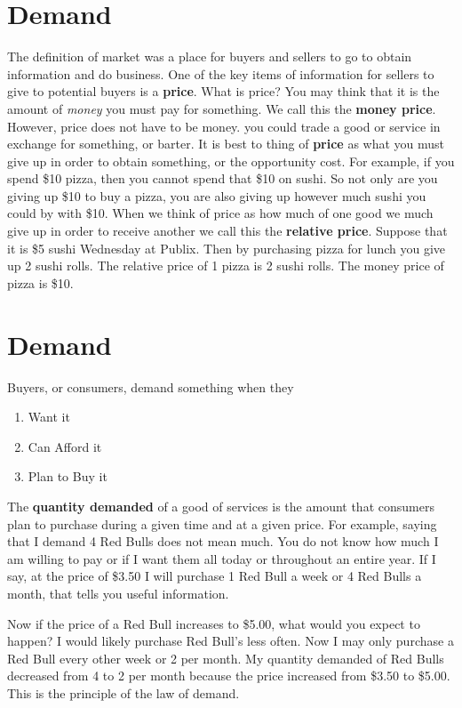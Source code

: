 \documentclass[
]{book}
\providecommand{\tightlist}{%
  \setlength{\itemsep}{0pt}\setlength{\parskip}{0pt}}
\begin{document}
\section{Demand}\label{demand}

The definition of market was a place for buyers and sellers to go to obtain information and do business. One of the key items of information for sellers to give to potential buyers is a \textbf{price}. What is price? You may think that it is the amount of \emph{money} you must pay for something. We call this the \textbf{money price}. However, price does not have to be money. you could trade a good or service in exchange for something, or barter. It is best to thing of \textbf{price }as what you must give up in order to obtain something, or the opportunity cost. For example, if you spend \$10 pizza, then you cannot spend that \$10 on sushi. So not only are you giving up \$10 to buy a pizza, you are also giving up however much sushi you could by with \$10. When we think of price as how much of one good we much give up in order to receive another we call this the \textbf{relative price}. Suppose that it is \$5 sushi Wednesday at Publix. Then by purchasing pizza for lunch you give up 2 sushi rolls. The relative price of 1 pizza is 2 sushi rolls. The money price of pizza is \$10.

\section{Demand}\label{demand-1}

Buyers, or consumers, demand something when they

\begin{enumerate}
\def\labelenumi{\arabic{enumi}.}
\tightlist
\item
  Want it
\item
  Can Afford it
\item
  Plan to Buy it
\end{enumerate}

The \textbf{quantity demanded} of a good of services is the amount that consumers plan to purchase during a given time and at a given price. For example, saying that I demand 4 Red Bulls does not mean much. You do not know how much I am willing to pay or if I want them all today or throughout an entire year. If I say, at the price of \$3.50 I will purchase 1 Red Bull a week or 4 Red Bulls a month, that tells you useful information.

Now if the price of a Red Bull increases to \$5.00, what would you expect to happen? I would likely purchase Red Bull's less often. Now I may only purchase a Red Bull every other week or 2 per month. My quantity demanded of Red Bulls decreased from 4 to 2 per month because the price increased from \$3.50 to \$5.00. This is the principle of the law of demand.
\end{document}
